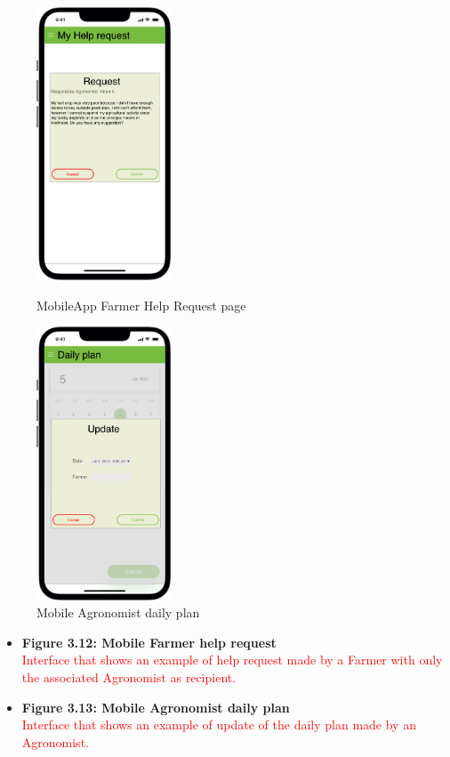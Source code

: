 \begin{figure}[H]
  \centering
   \begin{minipage}{0.4\textwidth}
     \includegraphics[width=40mm,scale=0.9]{./Images//Mocks/Mobile/Farmer_help_req.png}
     \caption{MobileApp Farmer Help Request page}
   \end{minipage}
    \hfill
   \begin{minipage}{0.4\textwidth}
     \includegraphics[width=40mm,scale=0.9]{./Images//Mocks/Mobile/Agronomist_daily_plan.png}
     \caption{Mobile Agronomist daily plan}
   \end{minipage}
\end{figure}

\begin{itemize}
    \item \textbf{Figure 3.12: Mobile Farmer help request}\\ 
    \textcolor{red}{Interface that shows an example of help request made by a Farmer with only the associated Agronomist as recipient.}
\end{itemize}
\begin{itemize}
    \item \textbf{Figure 3.13: Mobile Agronomist daily plan}\\ 
    \textcolor{red}{Interface that shows an example of update of the daily plan made by an Agronomist.}
\end{itemize}
\newpage

